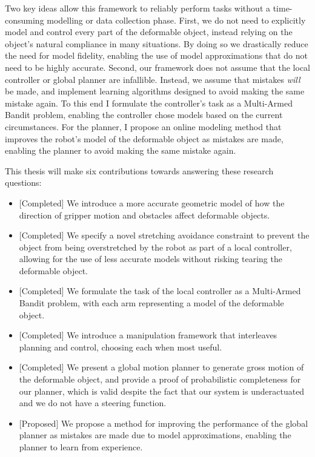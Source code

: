 Two key ideas allow this framework to reliably perform tasks without a time-consuming modelling or data collection phase. First, we do not need to explicitly model and control every part of the deformable object, instead relying on the object's natural compliance in many situations. By doing so we drastically reduce the need for model fidelity, enabling the use of model approximations that do not need to be highly accurate. Second, our framework does not assume that the local controller or global planner are infallible. Instead, we assume that mistakes \textit{will} be made, and implement learning algorithms designed to avoid making the same mistake again. To this end I formulate the controller's task as a Multi-Armed Bandit problem, enabling the controller chose models based on the current circumstances. For the planner, I propose an online modeling method that improves the robot's model of the deformable object as mistakes are made, enabling the planner to avoid making the same mistake again.

This thesis will make six contributions towards answering these research questions:
\begin{itemize}
    \item {[Completed]} We introduce a more accurate geometric model of how  the direction of gripper motion and obstacles affect deformable objects.
    \item {[Completed]} We specify a novel stretching avoidance constraint to prevent the object from being overstretched by the robot as part of a local controller, allowing for the use of less accurate models without risking tearing the deformable object.
    \item {[Completed]} We formulate the task of the local controller as a Multi-Armed Bandit problem, with each arm representing a model of the deformable object.
    \item {[Completed]} We introduce a manipulation framework that interleaves planning and control, choosing each when most useful.
    \item {[Completed]} We present a global motion planner to generate gross motion of the deformable object, and provide a proof of probabilistic completeness for our planner, which is valid despite the fact that our system is underactuated and we do not have a steering function.
    \item {[Proposed]} We propose a method for improving the performance of the global planner as mistakes are made due to model approximations, enabling the planner to learn from experience.
\end{itemize}

